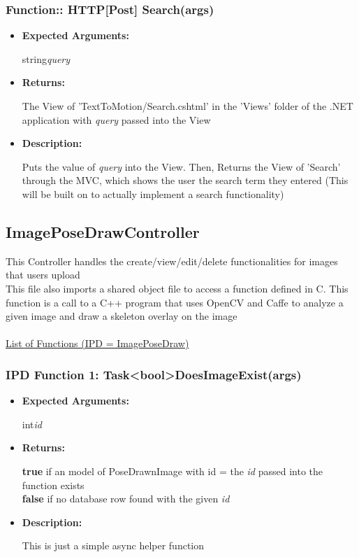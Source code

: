 \documentclass{scrreprt}
\begin{document}
\subsubsection{Function:: HTTP[Post] Search(args)}
\begin{itemize}
    \item \textbf{Expected Arguments:}

    string\quad\textit{query}

    \item \textbf{Returns:}

    The View of 'TextToMotion/Search.cshtml' in the 'Views' folder of the .NET application with \textit{query} passed into the View

    \item \textbf{Description:}

    Puts the value of \textit{query} into the View. Then, Returns the View of 'Search' through the MVC, which shows the user the search term they entered (This will be built on to actually implement a search functionality)

\end{itemize}


\subsection{ImagePoseDrawController}

This Controller handles the create/view/edit/delete functionalities for images that users upload
\\
This file also imports a shared object file to access a function defined in C. This function is a call to a C++ program that uses OpenCV and Caffe to analyze a given image and draw a skeleton overlay on the image
\\\\
\underline{List of Functions (IPD = ImagePoseDraw)}

\subsubsection{IPD Function 1: Task\textless bool\textgreater DoesImageExist(args)}
\begin{itemize}
    \item \textbf{Expected Arguments:}

    int\quad\textit{id}

    \item \textbf{Returns:}

    \textbf{true} if an model of PoseDrawnImage with id = the \textit{id} passed into the function exists
    \\
    \textbf{false} if no database row found with the given \textit{id}

    \item \textbf{Description:}

    This is just a simple async helper function
\end{itemize}
\end{document}
